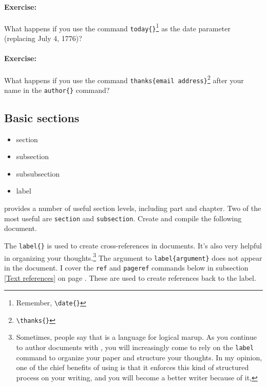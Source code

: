         \paragraph{Exercise:}What happens if you use the command \texttt{today\{\}}\footnote{Remember, \texttt{\textbackslash{}date\{\}}} as the date parameter (replacing July 4, 1776)?

        \paragraph{Exercise:}What happens if you use the command \texttt{thanks\{email address\}}\footnote{\texttt{\textbackslash{}thanks\{\}}} after your name in the \texttt{author\{\}} command?

        \subsection{Basic sections}
        \label{Basic-sections}
        
        \begin{cmd}
            \begin{itemize}
                \item{section}
                \item{subsection}
                \item{subsubsection}
                \item{label}
            \end{itemize}
        \end{cmd}

        \Lx{} provides a number of useful section levels, including part and chapter. Two of the most useful are \texttt{section} and \texttt{subsection}. Create and compile the following document. 

        The \texttt{label\{\}} is used to create cross-references in documents. It's also very helpful in organizing your thoughts.\footnote{Sometimes, people say that \Lx{} is a language for logical marup. As you continue to author documents with \Lx{}, you will increasingly come to rely on the \texttt{label} command to organize your paper and structure your thoughts. In my opinion, one of the chief benefits of using \Lx{} is that it enforces this kind of structured process on your writing, and you will become a better writer because of it,} The argument to \texttt{label\{argument\}} does not appear in the document. I cover the \texttt{ref} and \texttt{pageref} commands below in subsection \ref{Text references} on page \pageref{Text references}. These are used to create references back to the label.

